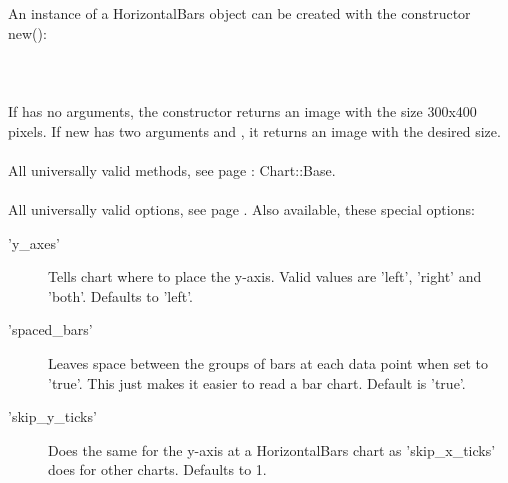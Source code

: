  An instance of a HorizontalBars object can be created with the constructor new():\\
\\
\\
\\
If  has no arguments, the constructor returns an image with the size 300x400 pixels. If new has two arguments  and , it returns an image with the desired size. \\ 
\\ 
All universally valid methods, see page \pageref{methods}: Chart::Base. \\
\\
 All universally valid options, see page \pageref{options}. Also available, these special options:
\begin{description}
\item['y\_axes'] Tells chart where to place the y-axis. Valid values are 'left', 'right' and 'both'. Defaults to 'left'.
\item['spaced\_bars']Leaves space between the groups of bars at each data point when set to 'true'.  This just makes it easier to read a bar chart.  Default is 'true'.
\item['skip\_y\_ticks'] Does the same for the y-axis at a HorizontalBars chart as 'skip\_x\_ticks' does for other charts. Defaults to 1.
\end{description}